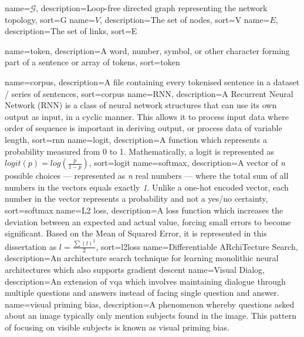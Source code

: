 {
    name=\(\mathcal{G}\),
    description={Loop-free directed graph representing the network topology},
    sort=G
}
{
    name=\(V\),
    description={The set of nodes},
    sort=V
}
{
    name=\(E\),
    description={The set of links},
    sort=E
}

{
    name=token,
    description={A word, number, symbol, or other character forming part of a sentence or array of tokens},
    sort=token
}

{
    name=corpus,
    description={A file containing every tokenised sentence in a dataset / series of sentences},
    sort=corpus
}
{
    name={RNN},
    description={A Recurrent Neural Network (RNN) is a class of neural network structures that
    can use its own output as input, in a cyclic manner. This allows it to process input data where order of sequence is important in deriving output, or process data of variable length},
    sort=rnn
}
{
    name={logit},
    description={A function which represents a probability measured from 0 to 1. Mathematically, a logit is represented as \(logit(p)=log(\frac{p}{1-p})\)},
    sort=logit
}
{
    name={softmax},
    description={A vector of \textit{n} possible choices --- represented as \textit{n} real numbers --- where the total sum of all numbers in the vectors equals exactly \textit{1}. Unlike a one-hot encoded vector, each number in the vector represents a probability and not a yes/no certainty},
    sort=softmax
}
{
    name={L2 loss},
    description={A loss function which increases the deviation between an expected and actual value, forcing small errors to become significant. Based on the Mean of Squared Error, it is represented in this dissertation as \(l=\frac{\sum(l)^2}{2}\)},
    sort=l2loss
}
{
    name={Differentiable ARchiTecture Search},
    description={An architecture search technique for learning monolithic neural architectures which also supports gradient descent}
}
{
    name={Visual Dialog},
    description={An extension of \gls{vqa} which involves maintaining dialogue through multiple questions and answers instead of facing single question and answer. }
}
{
    name={visual priming bias},
    description={A phenomenon whereby questions asked about an image typically only mention subjects found in the image. This pattern of focusing on visible subjects is known as visual priming bias.}
}